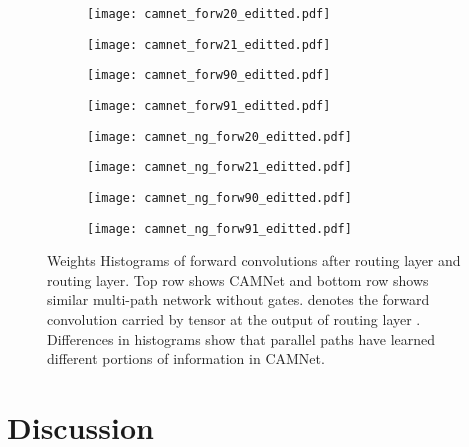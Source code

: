 \documentclass[10pt,twocolumn,letterpaper]{article}
\begin{document}
\begin{figure}[htbp]
	\begin{center}
		\begin{subfigure}[]{0.24\linewidth}
			\texttt{[image: camnet\_forw20\_editted.pdf]} 
		\end{subfigure}
		\begin{subfigure}[]{0.24\linewidth}
			\texttt{[image: camnet\_forw21\_editted.pdf]}
		\end{subfigure}
		\begin{subfigure}[]{0.24\linewidth}
			\texttt{[image: camnet\_forw90\_editted.pdf]}
		\end{subfigure}
		\begin{subfigure}[]{0.24\linewidth}
			\texttt{[image: camnet\_forw91\_editted.pdf]}
		\end{subfigure}
		
		\begin{subfigure}[]{0.24\linewidth}
			\texttt{[image: camnet\_ng\_forw20\_editted.pdf]}
			\caption{} 
		\end{subfigure}
		\begin{subfigure}[]{0.24\linewidth}
			\texttt{[image: camnet\_ng\_forw21\_editted.pdf]}
			\caption{}
		\end{subfigure}
		\begin{subfigure}[]{0.24\linewidth}
			\texttt{[image: camnet\_ng\_forw90\_editted.pdf]}
			\caption{}
		\end{subfigure}
		\begin{subfigure}[]{0.24\linewidth}
			\texttt{[image: camnet\_ng\_forw91\_editted.pdf]}
			\caption{}
		\end{subfigure}
	\end{center}
	\vspace{-0.2in}
	\caption{Weights Histograms of forward convolutions after  routing layer and  routing layer. Top row shows CAMNet and bottom row shows similar multi-path network without gates.  denotes the forward convolution carried by tensor  at the output of routing layer . Differences in histograms show that parallel paths have learned different portions of information in CAMNet.}
	\label{fig:histograms}
	\vspace{-0.1in}
\end{figure}


\section{Discussion}
\label{se:discussion}
\vspace{-0.05in}
\end{document}
